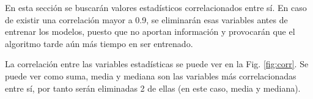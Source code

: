 En esta sección se buscarán valores estadísticos correlacionados entre sí. En caso de existir una correlación mayor a 0.9, se eliminarán esas variables antes de entrenar los modelos, puesto que no aportan información y provocarán que el algoritmo tarde aún más tiempo en ser entrenado.

La correlación entre las variables estadísticas se puede ver en la Fig. \ref{fig:corr}. Se puede ver como suma, media y mediana son las variables más correlacionadas entre sí, por tanto serán eliminadas 2 de ellas (en este caso, media y mediana).

\begin{figure}
    \centering
\end{figure}
